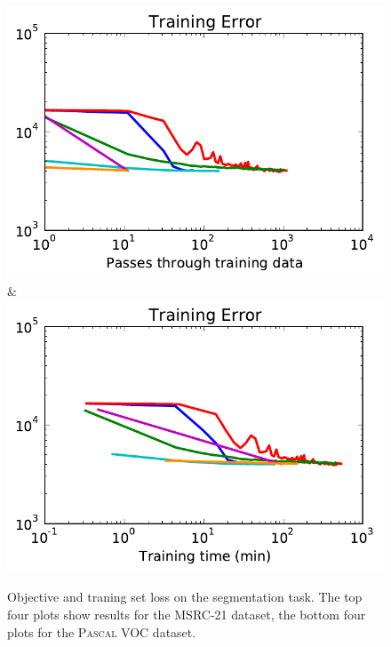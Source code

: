 \begin{figure}
\begin{tabu}
    \includegraphics[width=\linewidth]{evaluation/images/pascal_loss}&%
    \includegraphics[width=\linewidth]{evaluation/images/pascal_time_loss}
    \end{tabu}
\caption{%
    Objective and traning set loss on the segmentation task. The top four plots
    show results for the MSRC-21 dataset, the bottom four plots for the \textsc{Pascal
    VOC} dataset.
}
\end{figure}

